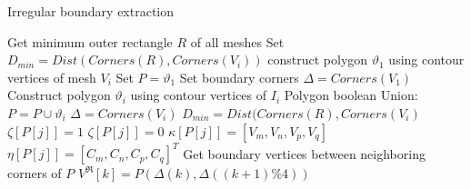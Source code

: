 \documentclass[10pt,journal,compsoc]{IEEEtran}
\begin{document}
\begin{algorithm}
 \label{alg:irregular_boundary}
     \caption{Irregular boundary extraction}
        Get minimum outer rectangle $R$ of all meshes\;
        Set $D_{min} = Dist(Corners(R), Corners(V_i))$\;
        construct polygon $\vartheta_1$ using contour vertices of mesh $V_i$\;
        Set $P=\vartheta_1$\;
        Set boundary corners $\Delta= Corners(V_1)$\;
        {
            Construct polygon $\vartheta_i$ using contour vertices of $I_i$\;
            Polygon boolean Union: $P=P\cup\vartheta_i$\;
            {
                    $\Delta = Corners(V_i)$\;
                    $D_{min}=Dist(Corners(R), Corners(V_i)$\;
            }
        }
        {
             {
                 $\zeta[P[j]]=1$\;
             }
             {
                 $\zeta[P[j]]=0$\;
                 $\kappa[P[j]]=[V_m,V_n,V_p,V_q]$\;
                 $\eta[P[j]]=[C_m,C_n,C_p,C_q]^T$\;
             }
        }
       Get boundary vertices between neighboring corners of $P$\;
         {
                 $V^{\Re}[k]=P(\Delta(k),\Delta((k+1)\%4))$\;
         }
\end{algorithm}

\begin{comment}
\begin{figure}[t] %
  \centering
  \texttt{[image: polybool]}

  \caption{Flowchart of irregular Pipeline of \emph{StereoPasting}. In the preprocessing step, we first select and triangulate the 2D foreground, then estimate the disparity map of the target scene. After that we edit the disparity map of the 2D foreground by painting strokes and blend it with the 3D background for depth-consistent composition. At last, the 2D foreground is warped and blended into the target image pair to get the composition results.} \label{fig:polybool}
\end{figure}

\begin{comment}
\begin{figure}[t] %
  \centering
  \texttt{[image: polybool2]}

  \caption{A challenging example of irregular boundary construction.} \label{fig:polybool2}
\end{figure}
\end{comment}
\end{document}
